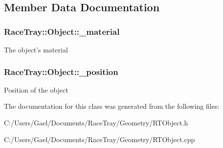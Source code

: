 \subsection{Member Data Documentation}
\hypertarget{class_race_tray_1_1_object_a659c1956bd811a2cc687fd899f3aa0e0}{
\subsubsection[{\-\_\-material}]{ Race\-Tray\-::\-Object\-::\-\_\-material\hspace{0.3cm}{\ttfamily [protected]}}}\label{class_race_tray_1_1_object_a659c1956bd811a2cc687fd899f3aa0e0}
The object's material \hypertarget{class_race_tray_1_1_object_afc27cf33104f6af734684534e3230723}{
\subsubsection[{\-\_\-position}]{ Race\-Tray\-::\-Object\-::\-\_\-position\hspace{0.3cm}{\ttfamily [protected]}}}\label{class_race_tray_1_1_object_afc27cf33104f6af734684534e3230723}
Position of the object 

The documentation for this class was generated from the following files\-:\begin{DoxyCompactItemize}
\item 
C\-:/\-Users/\-Gael/\-Documents/\-Race\-Tray/\-Geometry/R\-T\-Object.\-h\item 
C\-:/\-Users/\-Gael/\-Documents/\-Race\-Tray/\-Geometry/R\-T\-Object.\-cpp\end{DoxyCompactItemize}
